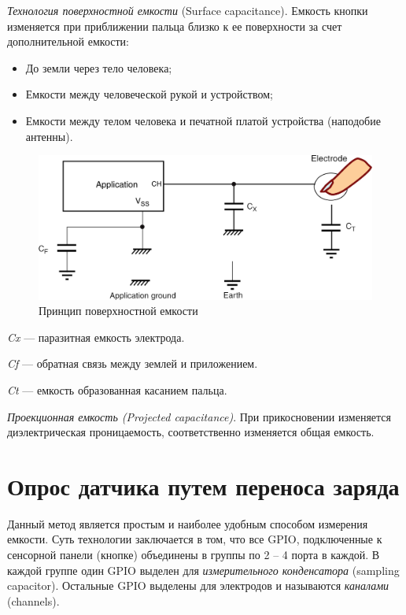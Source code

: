 	\textit{Технология поверхностной емкости }(Surface capacitance). Емкость кнопки изменяется при приближении пальца близко к ее поверхности за счет дополнительной емкости: 
\begin{itemize}
\item До земли через тело человека;
\item Емкости между человеческой рукой и устройством;
\item Емкости между телом человека и печатной платой устройства (наподобие антенны).
\end{itemize}
\begin{figure}[H]
\begin{center}
\includegraphics[scale=0.25]{Image/55.jpg} 
\end{center}
\caption{Принцип поверхностной емкости}
\end{figure}

\textit {Cx} --- паразитная емкость электрода.
 
\textit {Cf} --- обратная связь между землей и приложением.

\textit {Ct} --- емкость образованная касанием пальца.

\textit{Проекционная емкость (Projected capacitance)}. При прикосновении изменяется диэлектрическая проницаемость, соответственно изменяется общая емкость.

\section{Опрос датчика путем переноса заряда}

Данный метод является простым и наиболее удобным способом измерения емкости. Суть технологии заключается в том, что все GPIO, подключенные к сенсорной панели (кнопке) объединены в группы по 2 -- 4 порта в каждой. В каждой группе один GPIO выделен для \textit{измерительного конденсатора} (sampling capacitor). Остальные GPIO выделены для электродов и называются \textit{каналами} (channels).

